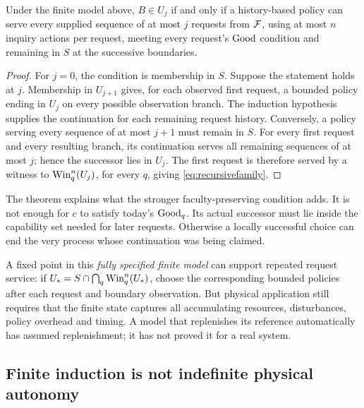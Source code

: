 \begin{theorem}
\label{thm:requests}
Under the finite model above, \(B\in U_j\) if and only if a history-based policy can serve every supplied sequence of at most \(j\) requests from \(\mathcal F\), using at most \(n\) inquiry actions per request, meeting every request's \(\operatorname{Good}\) condition and remaining in \(S\) at the successive boundaries.
\end{theorem}
\begin{proof}
For \(j=0\), the condition is membership in \(S\). Suppose the statement holds at \(j\). Membership in \(U_{j+1}\) gives, for each observed first request, a bounded policy ending in \(U_j\) on every possible observation branch. The induction hypothesis supplies the continuation for each remaining request history. Conversely, a policy serving every sequence of at most \(j+1\) must remain in \(S\). For every first request and every resulting branch, its continuation serves all remaining sequences of at most \(j\); hence the successor lies in \(U_j\). The first request is therefore served by a witness to \(\operatorname{Win}_q^n(U_j)\), for every \(q\), giving \eqref{eq:recursivefamily}.
\end{proof}

The theorem explains what the stronger faculty-preserving condition adds. It is not enough for \(c\) to satisfy today's \(\operatorname{Good}_q\). Its actual successor must lie inside the capability set needed for later requests. Otherwise a locally successful choice can end the very process whose continuation was being claimed.

A fixed point in this \emph{fully specified finite model} can support repeated request service: if \(U_*=S\cap\bigcap_q\operatorname{Win}_q^n(U_*)\), choose the corresponding bounded policies after each request and boundary observation. But physical application still requires that the finite state captures all accumulating resources, disturbances, policy overhead and timing. A model that replenishes its reference automatically has assumed replenishment; it has not proved it for a real system.

\subsection{Finite induction is not indefinite physical autonomy}

